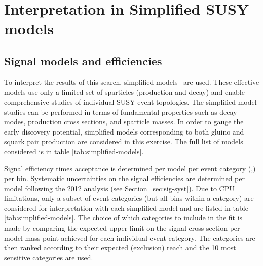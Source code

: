 \section{Interpretation in Simplified SUSY models}
\label{sec:susy}

\subsection{Signal models and efficiencies}
\label{subsec:susy_models}
To interpret the results of this search, simplified
models~\cite{Alwall:2008ag,Alwall:2008va,sms} are used. These
effective models use only a limited set of sparticles (production and
decay) and enable comprehensive studies of individual SUSY event
topologies. The simplified model studies can be performed in terms of
fundamental properties such as decay modes, production cross sections,
and sparticle masses. 
In order to gauge the early discovery potential, simplified models corresponding to both gluino and squark pair production 
are considered in this exercise. The full list of models considered is in table \ref{tab:simplified-models}. 

Signal efficiency times acceptance is determined per model per event
category (\njet,\nb) per \scalht bin. Systematic
uncertainties on the signal efficiencies are determined per model
following the 2012 analysis (see Section~\ref{sec:sig-syst}). Due to CPU
limitations, only a subset of event categories (but all \scalht bins
within a category) are considered for interpretation with each
simplified model and are listed in table \ref{tab:simplified-models}. 
The choice of which categories to include in the fit 
is made by comparing the expected upper limit on the signal cross section 
per model mass point achieved for each individual event category. 
The categories are then ranked according to their expected (exclusion) reach 
and the 10 most sensitive categories are used. 

